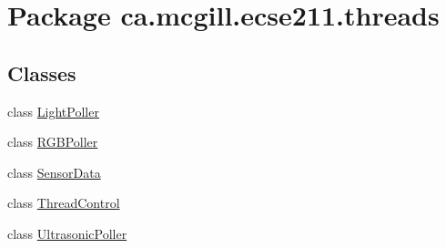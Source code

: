 \hypertarget{namespaceca_1_1mcgill_1_1ecse211_1_1threads}{}\section{Package ca.\+mcgill.\+ecse211.\+threads}
\label{namespaceca_1_1mcgill_1_1ecse211_1_1threads}
\subsection*{Classes}
\begin{DoxyCompactItemize}
\item 
class \hyperlink{classca_1_1mcgill_1_1ecse211_1_1threads_1_1_light_poller}{Light\+Poller}
\item 
class \hyperlink{classca_1_1mcgill_1_1ecse211_1_1threads_1_1_r_g_b_poller}{R\+G\+B\+Poller}
\item 
class \hyperlink{classca_1_1mcgill_1_1ecse211_1_1threads_1_1_sensor_data}{Sensor\+Data}
\item 
class \hyperlink{classca_1_1mcgill_1_1ecse211_1_1threads_1_1_thread_control}{Thread\+Control}
\item 
class \hyperlink{classca_1_1mcgill_1_1ecse211_1_1threads_1_1_ultrasonic_poller}{Ultrasonic\+Poller}
\end{DoxyCompactItemize}
